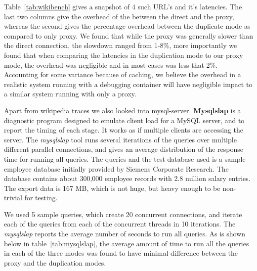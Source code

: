 Table~\ref{tab:wikibench} gives a snapshot of 4 such URL's and it's latencies. 
The last two columns give the overhead of the  between the direct and the proxy, whereas the second gives the percentage overhead between the duplicate mode as compared to only proxy.
We found that while the proxy was generally slower than the direct connection, the slowdown ranged from 1-8\%, more importantly we found that when comparing the latencies in the duplication mode to our proxy mode, the overhead was negligible and in most cases was less that 2\%. 
Accounting for some variance because of caching, we believe the overhead in a realistic system running with a debugging container will have negligible impact to a similar system running with only a proxy. 

\begin{comment}
One of the difficulties in accurately measuring latencies was that since most GIT page fetches were sub-second, database, and webservers caching came into play. 
This meant that in several of our initial runs the latency observed for some of the requests were better with the proxy or duplicator, compared to the native execution.
However after a couple of runs of the entire trace, the latencies observed were consistent.
\end{comment}

Apart from wikipedia traces we also looked into mysql-server. 
\textbf{Mysqlslap} is a diagnostic program designed to emulate client load for a MySQL server, and to report the timing of each stage. 
It works as if multiple clients are accessing the server. The \emph{mysqlslap} tool runs several iterations of the queries over multiple different parallel connections, and gives an average distribution of the response time for running all queries.
The queries and the test database used is a sample employee database initially provided by Siemens Corporate Research. 
The database contains about 300,000 employee records with 2.8 million salary entries. The export data is 167 MB, which is not huge, but heavy enough to be non-trivial for testing.

We used 5 sample queries, which create 20 concurrent connections, and iterate each of the queries from each of the concurrent threads in 10 iterations.
The \emph{mysqlslap} reports the average number of seconds to run all queries. As is shown below in table~\ref{tab:mysqlslap}, the average amount of time to run all the queries in each of the three modes was found to have minimal difference between the proxy and the duplication modes.

